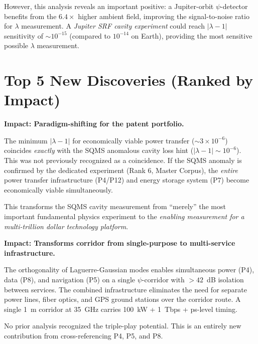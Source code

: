 \documentclass[aps,prd,twocolumn,superscriptaddress]{revtex4-2}
\begin{document}
However, this analysis reveals an important positive: a Jupiter-orbit
$\psi$-detector benefits from the $6.4\times$ higher ambient field,
improving the signal-to-noise ratio for $\lambda$ measurement.  A
\emph{Jupiter SRF cavity experiment} could reach $|\lambda-1|$ sensitivity
of $\sim 10^{-15}$ (compared to $10^{-14}$ on Earth), providing the
most sensitive possible $\lambda$ measurement.

\section{Top 5 New Discoveries (Ranked by Impact)}
\label{sec:top5}

\begin{tcolorbox}[colback=blue!5!white,colframe=blue!75!black,title=
{Discovery \#1: The SQMS-Power Coincidence}]
\textbf{Impact: Paradigm-shifting for the patent portfolio.}

The minimum $|\lambda-1|$ for economically viable power transfer
($\sim 3\times 10^{-6}$) coincides \emph{exactly} with the SQMS
anomalous cavity loss hint ($|\lambda-1| \sim 10^{-6}$).  This was
not previously recognized as a coincidence.  If the SQMS anomaly is
confirmed by the dedicated experiment (Rank 6, Master Corpus), the
\emph{entire} power transfer infrastructure (P4/P12) and energy
storage system (P7) become economically viable simultaneously.

This transforms the SQMS cavity measurement from ``merely'' the most
important fundamental physics experiment to the \emph{enabling
measurement for a multi-trillion dollar technology platform}.
\end{tcolorbox}

\begin{tcolorbox}[colback=green!5!white,colframe=green!75!black,title=
{Discovery \#2: Triple-Play Corridor via LG Mode Orthogonality}]
\textbf{Impact: Transforms corridor from single-purpose to
multi-service infrastructure.}

The orthogonality of Laguerre-Gaussian modes enables simultaneous
power (P4), data (P8), and navigation (P5) on a single $\psi$-corridor
with $>42$~dB isolation between services.  The combined infrastructure
eliminates the need for separate power lines, fiber optics, and GPS
ground stations over the corridor route.  A single 1~m corridor at
35~GHz carries 100~kW + 1~Tbps + ps-level timing.

No prior analysis recognized the triple-play potential.  This is an
entirely new contribution from cross-referencing P4, P5, and P8.
\end{tcolorbox}
\end{document}
